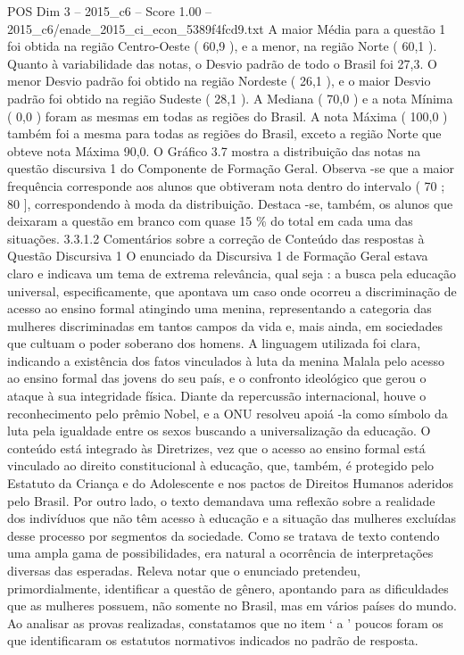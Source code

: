 \begin{textsample}{POS Dim 3 – 2015\_c6 – Score 1.00 – 2015\_c6/enade\_2015\_ci\_econ\_5389f4fcd9.txt}
A maior Média para a questão 1 foi obtida na região Centro-Oeste ( 60,9 ), e a menor, na região Norte ( 60,1 ).
Quanto à variabilidade das notas, o Desvio padrão de todo o Brasil foi 27,3.
O menor Desvio padrão foi obtido na região Nordeste ( 26,1 ), e o maior Desvio padrão foi obtido na região Sudeste ( 28,1 ).
A Mediana ( 70,0 ) e a nota Mínima ( 0,0 ) foram as mesmas em todas as regiões do Brasil.
A nota Máxima ( 100,0 ) também foi a mesma para todas as regiões do Brasil, exceto a região Norte que obteve nota Máxima 90,0.
O Gráfico 3.7 mostra a distribuição das notas na questão discursiva 1 do Componente de Formação Geral.
Observa -se que a maior frequência corresponde aos alunos que obtiveram nota dentro do intervalo ( 70 ; 80 ], correspondendo à moda da distribuição.
Destaca -se, também, os alunos que deixaram a questão em branco com quase 15 \% do total em cada uma das situações. 3.3.1.2 Comentários sobre a correção de Conteúdo das respostas à Questão Discursiva 1 O enunciado da Discursiva 1 de Formação Geral estava claro e indicava um tema de extrema relevância, qual seja : a busca pela educação universal, especificamente, que apontava um caso onde ocorreu a discriminação de acesso ao ensino formal atingindo uma menina, representando a categoria das mulheres discriminadas em tantos campos da vida e, mais ainda, em sociedades que cultuam o poder soberano dos homens.
A linguagem utilizada foi clara, indicando a existência dos fatos vinculados à luta da menina Malala pelo acesso ao ensino formal das jovens do seu país, e o confronto ideológico que gerou o ataque à sua integridade física.
Diante da repercussão internacional, houve o reconhecimento pelo prêmio Nobel, e a ONU resolveu apoiá -la como símbolo da luta pela igualdade entre os sexos buscando a universalização da educação.
O conteúdo está integrado às Diretrizes, vez que o acesso ao ensino formal está vinculado ao direito constitucional à educação, que, também, é protegido pelo Estatuto da Criança e do Adolescente e nos pactos de Direitos Humanos aderidos pelo Brasil.
Por outro lado, o texto demandava uma reflexão sobre a realidade dos indivíduos que não têm acesso à educação e a situação das mulheres excluídas desse processo por segmentos da sociedade.
Como se tratava de texto contendo uma ampla gama de possibilidades, era natural a ocorrência de interpretações diversas das esperadas.
Releva notar que o enunciado pretendeu, primordialmente, identificar a questão de gênero, apontando para as dificuldades que as mulheres possuem, não somente no Brasil, mas em vários países do mundo.
Ao analisar as provas realizadas, constatamos que no item ‘ a ’ poucos foram os que identificaram os estatutos normativos indicados no padrão de resposta.

\end{textsample}
